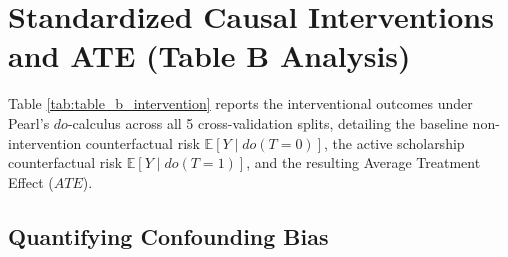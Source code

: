 \section{Standardized Causal Interventions and ATE (Table B Analysis)}
\label{sec:exp_causal_interventions}

Table \ref{tab:table_b_intervention} reports the interventional outcomes under Pearl's $do$-calculus across all 5 cross-validation splits, detailing the baseline non-intervention counterfactual risk $\mathbb{E}[Y \mid do(T=0)]$, the active scholarship counterfactual risk $\mathbb{E}[Y \mid do(T=1)]$, and the resulting Average Treatment Effect ($ATE$).

\begin{table}[htbp]
    \centering
    \small
    \setlength{\tabcolsep}{6pt}
    \caption{Table B: Standardized Causal Interventions and Average Treatment Effects ($ATE$).}
    \label{tab:table_b_intervention}
\end{table}

\subsection{Quantifying Confounding Bias}

